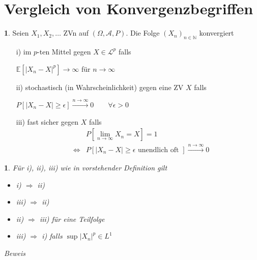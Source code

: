 \documentclass[10pt,a4paper]{report}
\newcommand{\E}{\mathbb{E}}
\newcommand{\N}{\mathbb{N}}
\numberwithin{equation}{section}
\numberwithin{figure}{section}
\theoremstyle{plain}
\theoremstyle{definition}
\newtheorem{defn}{\protect\definitionname}[section]
\theoremstyle{plain}
\newtheorem{prop}{\protect\propositionname}[section]
\theoremstyle{definition}
\theoremstyle{remark}
\theoremstyle{plain}
\theoremstyle{plain}
\theoremstyle{plain}
\theoremstyle{plain}
\theoremstyle{plain}
\providecommand{\definitionname}{Definition}
\providecommand{\propositionname}{Satz}
\newcommand{\1}{ \mathbb{1} } %
\begin{document}
\section{Vergleich von Konvergenzbegriffen}
\label{sec:konvergenz}
\begin{defn}
  Seien $X_1,X_2,\ldots$ ZVn auf $(\Omega,\mathcal{A},P)$. Die Folge
  $(X_n)_{n \in \N}$ konvergiert
  \begin{itemize}
  \item[i)] im $p$-ten Mittel gegen $X \in \mathcal{L}^p$ falls
    \begin{center}
      $\E[|X_n-X|^p] \to \infty$ für $n \to \infty$
    \end{center}
  \item[ii)] stochastisch (in Wahrscheinlichkeit) gegen eine ZV $X$
    falls
    \begin{center}
      $P[|X_n-X|\geq \epsilon ] \overset{n \to \infty}{\to} 0\qquad
      \forall \epsilon >0$
    \end{center}
  \item[iii)] fast sicher gegen $X$ falls
    \begin{eqnarray*}
      && P\left[\lim\limits_{n \to \infty}X_n=X \right]=1\\
      &\Leftrightarrow &P[|X_n-X|\geq \epsilon \text{ unendlich oft }] \overset{n \to \infty}{\to} 0
    \end{eqnarray*}
  \end{itemize}
\end{defn}
\begin{prop}
  Für i), ii), iii) wie in vorstehender Definition gilt
  \begin{itemize}
  \item i) $\Rightarrow$ ii)
  \item iii) $\Rightarrow$ ii)
  \item ii) $\Rightarrow$ iii) für eine Teilfolge
  \item iii) $\Rightarrow$ i) falls $\sup|X_n|^p \in L^1$
  \end{itemize}
\end{prop}
\textit{Beweis}\\\\
\end{document}
